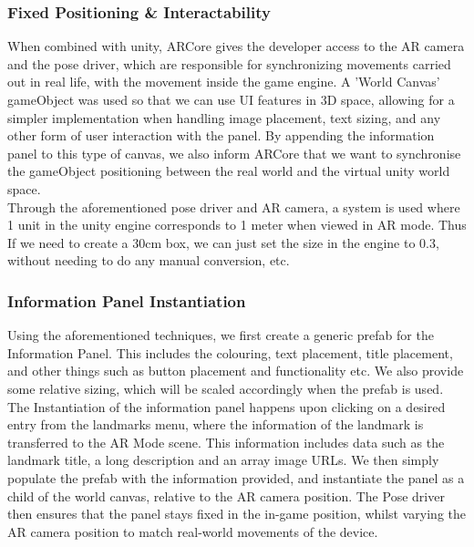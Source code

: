 \subsubsection{Fixed Positioning \& Interactability}
When combined with unity, ARCore gives the developer access to the AR camera and the pose driver, which are responsible for synchronizing movements 
carried out in real life, with the movement inside the game engine. A 'World Canvas' gameObject was used so that we can use UI features in 3D space, allowing for a simpler implementation when 
handling image placement, text sizing, and any other form of user interaction with the panel. By appending the information panel to this type of canvas, we also inform ARCore that 
we want to synchronise the gameObject positioning between the real world and the virtual unity world space.\\
\noindent
Through the aforementioned pose driver and AR camera, a system is used where 1 unit in the unity engine corresponds to 1 meter when
viewed in AR mode. Thus If we need to create a 30cm box, we can just set the size in the engine to 0.3, without needing to do any manual conversion, etc.

\subsubsection{Information Panel Instantiation}
Using the aforementioned techniques, we first create a generic prefab for the Information Panel. This includes the colouring, text placement, title placement, and 
other things such as button placement and functionality etc. We also provide some relative sizing, which will be scaled accordingly when the prefab is used.\\ 
The Instantiation of the information panel happens upon clicking on a desired entry from the landmarks menu, where the information of the landmark is transferred to the AR Mode scene.
This information includes data such as the landmark title, a long description and an array image URLs. We then simply populate the prefab with the information provided, and instantiate 
the panel as a child of the world canvas, relative to the AR camera position. 
The Pose driver then ensures that the panel stays fixed in the in-game position, whilst varying the AR camera position to 
match real-world movements of the device. 



